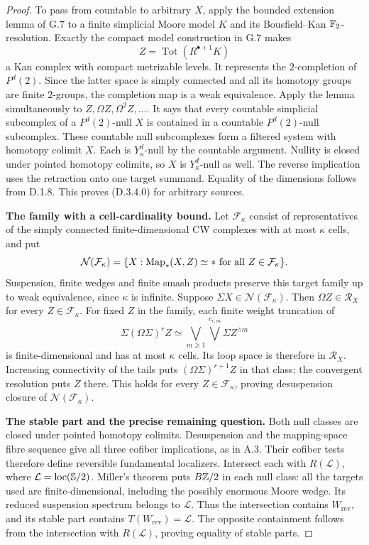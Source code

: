 \begin{proof}
To pass from countable to arbitrary $X$, apply the bounded
extension lemma of G.7 to a finite simplicial Moore model
$K$ and its Bousfield--Kan $\mathbb F_2$-resolution. Exactly the
compact model construction in G.7 makes
\[
                  Z=\operatorname{Tot}(R^{\bullet+1}K)
\]
a Kan complex with compact metrizable levels. It represents
the $2$-completion of $P^d(2)$. Since the latter space is
simply connected and all its homotopy groups are finite
$2$-groups, the completion map is a weak equivalence. Apply
the lemma simultaneously to $Z,\Omega Z,\Omega^2 Z,\ldots$.
It says that every countable simplicial subcomplex of a
$P^d(2)$-null $X$ is contained in a countable $P^d(2)$-null
subcomplex. These countable null subcomplexes form a filtered
system with homotopy colimit $X$. Each is $Y_\kappa^d$-null
by the countable argument. Nullity is closed under pointed
homotopy colimits, so $X$ is $Y_\kappa^d$-null as well.
The reverse implication uses the retraction onto one target
summand. Equality of the dimensions follows from D.1.8.
This proves (D.3.4.0) for arbitrary sources.

\medskip\noindent
\textbf{The family with a cell-cardinality bound.}
Let $\mathcal F_\kappa$ consist of representatives of the simply
connected finite-dimensional CW complexes with at most
$\kappa$ cells, and put
\[
 \mathcal N(\mathcal F_\kappa)=
       \{X:\operatorname{Map}_*(X,Z)\simeq *\text{ for all }Z\in\mathcal F_\kappa\}.
\]
Suspension, finite wedges and finite smash products preserve
this target family up to weak equivalence, since $\kappa$ is
infinite. Suppose $\Sigma X\in\mathcal N(\mathcal F_\kappa)$.
Then $\Omega Z\in\mathcal R_X$ for every
$Z\in\mathcal F_\kappa$. For fixed $Z$ in the family, each
finite weight truncation of
\[
 \Sigma(\Omega\Sigma)^rZ
     \simeq\bigvee_{m\geq1}\bigvee^{c_{r,m}}\Sigma Z^{\wedge m}
\]
is finite-dimensional and has at most $\kappa$ cells. Its loop
space is therefore in $\mathcal R_X$. Increasing connectivity
of the tails puts $(\Omega\Sigma)^{r+1}Z$ in that class; the
convergent resolution puts $Z$ there. This holds for every
$Z\in\mathcal F_\kappa$, proving desuspension closure of
$\mathcal N(\mathcal F_\kappa)$.

\medskip\noindent
\textbf{The stable part and the precise remaining question.}
Both null classes are closed under pointed homotopy colimits.
Desuspension and the mapping-space fibre sequence give all
three cofiber implications, as in A.3. Their cofiber tests
therefore define reversible fundamental localizers. Intersect
each with $R(\mathcal L)$, where $\mathcal L=\operatorname{loc}(\mathbb S/2)$.
Miller's theorem \cite[Theorem~A]{Miller1984} puts
$B\mathbb Z/2$ in each null class: all the targets used are
finite-dimensional, including the possibly enormous Moore
wedge. Its reduced suspension spectrum belongs to $\mathcal L$.
Thus the intersection contains $W_{\mathrm{rev}}$, and its
stable part contains $T(W_{\mathrm{rev}})=\mathcal L$.
The opposite containment follows from the intersection with
$R(\mathcal L)$, proving equality of stable parts.


\end{proof}
